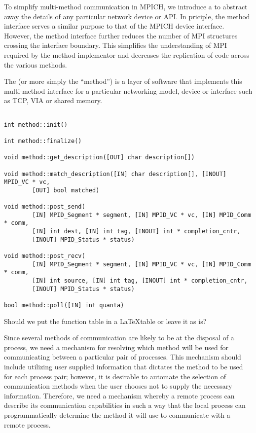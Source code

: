 To simplify multi-method communication in MPICH, we introduce a
 to abstract away the details of any particular
network device or API.  In priciple, the method interface serves a similar
purpose to that of the MPICH device interface.  However, the method interface
further reduces the number of MPI structures crossing the interface boundary.
This simplifies the understanding of MPI required by the method implementor and
decreases the replication of code across the various methods.

The  (or more simply the ``method'') is a layer of
software that implements this multi-method interface for a particular
networking model, device or interface such as TCP, VIA or shared memory.

\begin{verbatim}

int method::init()

int method::finalize()

void method::get_description([OUT] char description[])

void method::match_description([IN] char description[], [INOUT] MPID_VC * vc,
        [OUT] bool matched)

void method::post_send(
        [IN] MPID_Segment * segment, [IN] MPID_VC * vc, [IN] MPID_Comm * comm,
        [IN] int dest, [IN] int tag, [INOUT] int * completion_cntr,
        [INOUT] MPID_Status * status)

void method::post_recv(
        [IN] MPID_Segment * segment, [IN] MPID_VC * vc, [IN] MPID_Comm * comm,
        [IN] int source, [IN] int tag, [INOUT] int * completion_cntr,
        [INOUT] MPID_Status * status)

bool method::poll([IN] int quanta)
\end{verbatim}

\begin{cmt}[BRT]
Should we put the function table in a \LaTeX table or leave it as is?
\end{cmt}

Since several methods of communication are likely to be at the disposal of a
process, we need a mechanism for resolving which method will be used for
communicating between a particular pair of processes.  This mechanism should
include utilizing user supplied information that dictates the method to be used
for each process pair; however, it is desirable to automate the selection of
communication methods when the user chooses not to supply the necessary
information.  Therefore, we need a mechanism whereby a remote process can
describe its communication capabilities in such a way that the local process
can programmatically determine the method it will use to communicate with a
remote process.

